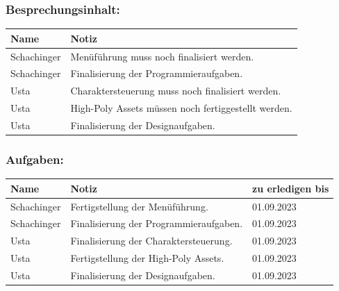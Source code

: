 \subsubsection*{Besprechungsinhalt:}
\begin{tabular}{|m{}|m{}|}
\hline
Name & Notiz \\
\hline
Schachinger & Menüführung muss noch finalisiert werden. \\
\hline
Schachinger & Finalisierung der Programmieraufgaben. \\
\hline
Usta & Charaktersteuerung muss noch finalisiert werden. \\
\hline
Usta & High-Poly Assets müssen noch fertiggestellt werden. \\
\hline
Usta & Finalisierung der Designaufgaben. \\
\hline
\end{tabular}

\subsubsection*{Aufgaben:}
\begin{tabular}{|m{}|m{}|m{}|}
\hline
Name & Notiz & zu erledigen bis \\
\hline
Schachinger & Fertigstellung der Menüführung. & 01.09.2023 \\
\hline
Schachinger & Finalisierung der Programmieraufgaben. & 01.09.2023 \\
\hline
Usta & Finalisierung der Charaktersteuerung.  & 01.09.2023 \\
\hline
Usta & Fertigstellung der High-Poly Assets. & 01.09.2023 \\
\hline
Usta & Finalisierung der Designaufgaben. & 01.09.2023 \\
\hline
\end{tabular}


\pagebreak

